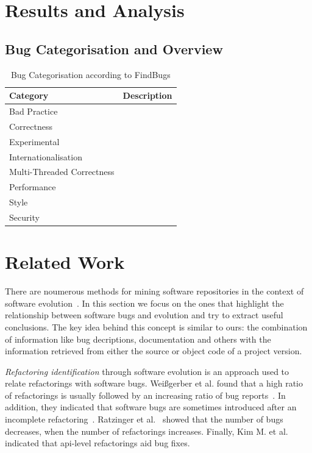 \documentclass[conference]{IEEEtran}
\begin{document}
\section{Results and Analysis}
\label{sec:res}

\subsection{Bug Categorisation and Overview}
\label{sec:bug}

\begin{table}
\centering
\caption{Bug Categorisation according to FindBugs}
\label{tbl:bug-categorisation}
\begin{tabular}{l r}
 \hline
Category & Description\\
\hline
Bad Practice & \\
Correctness & \\
Experimental & \\
Internationalisation & \\
Multi-Threaded Correctness & \\
Performance & \\
Style & \\
Security & \\
\hline
\end{tabular}
\end{table}

\section{Related Work}
\label{sec:rel}

There are noumerous methods for mining software repositories in the context
of software evolution~\cite{KCM07}. In this section we focus on the ones
that highlight the relationship between software bugs and evolution and try to
extract useful conclusions. The key idea behind this concept is
similar to ours: the combination of information like bug decriptions,
documentation and others with the information retrieved from either the source
or object code of a project version.

{\it Refactoring identification} through software evolution is an approach used to
relate refactorings with software bugs. Wei{\ss}gerber et al. found that a high
ratio of refactorings is usually followed by an increasing ratio of bug
reports~\cite{WD06}. In addition, they indicated that software bugs are sometimes introduced
after an incomplete refactoring~\cite{GW05}.
Ratzinger et al.~\cite{RSG08} showed that the number of bugs decreases, when the number of
refactorings increases. Finally, Kim M. et al.~\cite{KCK11} indicated that {\sc api}-level
refactorings aid bug fixes.
\end{document}
